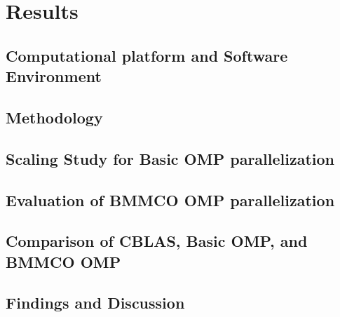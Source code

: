 \section{Results}


\subsection{Computational platform and Software Environment}
\label{subsec:computational-platform-and-software-environment}


\subsection{Methodology}
\label{subsec:methodology}


\subsection{Scaling Study for Basic OMP parallelization}
\label{subsec:scaling-study-basic}


\FloatBarrier
\subsection{Evaluation of BMMCO OMP parallelization}


\FloatBarrier
\subsection{Comparison of CBLAS, Basic OMP, and BMMCO OMP}
\label{subsec:comparison-cblas-basic-bmmco}


\FloatBarrier
\subsection{Findings and Discussion}
\label{subsec:findings-and-discussion}



